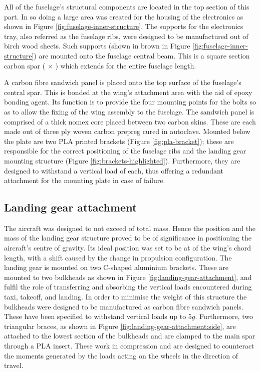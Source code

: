 \documentclass[../../main.tex]{subfiles}
\begin{document}
All of the fuselage's structural components are located in the top section of this part.
In so doing a large area was created for the housing of the electronics as shown in Figure \ref{fig:fuselage-inner-structure}.
The supports for the electronics tray, also referred as the fuselage ribs, were designed to be manufactured out of  birch wood sheets.
Such supports (shown in brown in Figure \ref{fig:fuselage-inner-structure}) are mounted onto the fuselage central beam.
This is a square section carbon spar ( $\times$ ) which extends for the entire fuselage length. 

A carbon fibre sandwich panel is placed onto the top surface of the fuselage's central spar.
This is bonded at the wing's attachment area with the aid of epoxy bonding agent.
Its function is to provide the four mounting points for the bolts so as to allow the fixing of the wing assembly to the fuselage.
The sandwich panel is comprised of a  thick nomex core placed between two carbon skins.
These are each made out of three ply woven carbon prepreg cured in autoclave.
Mounted below the plate are two PLA printed brackets (Figure \ref{fig:pla-bracket}); these are responsible for the correct positioning of the fuselage ribs and the landing gear mounting structure (Figure \ref{fig:brackets-highlighted}).
Furthermore, they are designed to withstand a vertical load of  each, thus offering a redundant attachment for the mounting plate in case of failure.


\subsection{Landing gear attachment} \label{sec:final-design-proposal:fuselage:landing-gear-attachment}

The aircraft was designed to not exceed  of total mass.
Hence the position and the mass of the landing gear structure proved to be of significance in positioning the aircraft's centre of gravity.
Its ideal position was set to be at  of the wing's chord length, with a  shift caused by the change in propulsion configuration.
The landing gear is mounted on two C-shaped  aluminium brackets.
These are mounted to two bulkheads as shown in Figure \ref{fig:landing-gear-attachment}, and fulfil the role of transferring and absorbing the vertical loads encountered during taxi, takeoff, and landing.
In order to minimise the weight of this structure the bulkheads were designed to be manufactured as carbon fibre sandwich panels.
These have been specified to withstand vertical loads up to $5g$.
Furthermore, two triangular braces, as shown in Figure \ref{fig:landing-gear-attachment:side}, are attached to the lowest section of the bulkheads and are clamped to the main spar through a PLA insert.
These work in compression and are designed to counteract the moments generated by the loads acting on the wheels in the direction of travel. 
\end{document}
